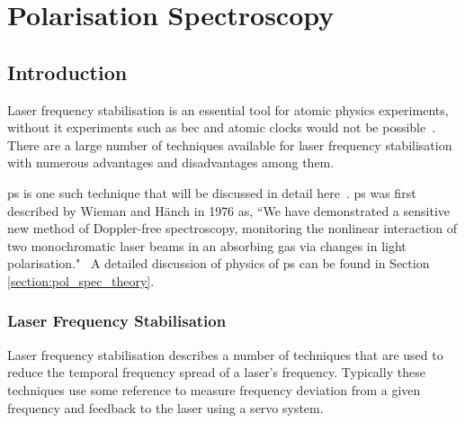 \chapter{Polarisation Spectroscopy}
\setcounter{page}{1}

\section{Introduction}

Laser frequency stabilisation is an essential tool for atomic physics experiments, without it experiments such as \gls{bec} and atomic clocks would not be possible~\cite{anderson_observation_1995,ye_quantum_2008}.
There are a large number of techniques available for laser frequency stabilisation with numerous advantages and disadvantages among them.

\Gls{ps} is one such technique that will be discussed in detail here~\cite{demtroder_laser_2003}.
\Gls{ps} was first described by Wieman and H\"anch in 1976 as, ``We have demonstrated a sensitive new method of Doppler-free spectroscopy, monitoring the nonlinear interaction of two monochromatic laser beams in an absorbing gas via changes in light polarisation."~\cite{wieman_doppler-free_1976}
A detailed discussion of physics of \gls{ps} can be found in Section \ref{section:pol_spec_theory}.

\subsection{Laser Frequency Stabilisation}

Laser frequency stabilisation describes a number of techniques that are used to reduce the temporal frequency spread of a laser's frequency.
Typically these techniques use some reference to measure frequency deviation from a given frequency and feedback to the laser using a servo system.

